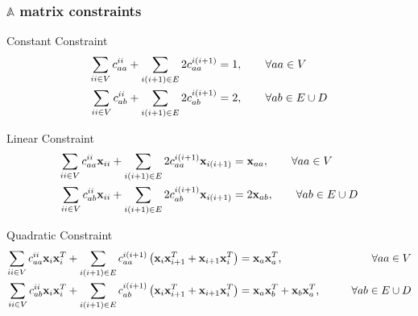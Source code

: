 \documentclass[compress,10pt]{beamer}
\renewcommand{\vec}[1]{\mathbf{#1}}
\begin{document}
\begin{frame}[t]\frametitle{\small $\mathbb{A}$ matrix constraints}
\vspace{-3mm}
\begin{block}{Constant Constraint}{\footnotesize
\begin{equation*}
\begin{aligned}
\sum\displaylimits_{ii \in V} c_{aa}^{ii} + \sum\displaylimits_{i(i+1) \in E} 2 c_{aa}^{i(i+1)} &= 1 , \qquad \forall aa \in V \\
\sum\displaylimits_{ii \in V} c_{ab}^{ii} + \sum\displaylimits_{i(i+1) \in E} 2 c_{ab}^{i(i+1)} &= 2 , \qquad \forall ab \in E \cup D
\end{aligned}
\end{equation*}
}\end{block}
\begin{block}{Linear Constraint}{\footnotesize
\begin{equation*}
\begin{aligned}
\sum\displaylimits_{ii \in V} c_{aa}^{ii} \vec{x}_{ii} + \sum\displaylimits_{i(i+1) \in E} 2 c_{aa}^{i(i+1)} \vec{x}_{i (i+1)} &= \vec{x}_{aa} , \qquad \forall aa \in V \\
\sum\displaylimits_{ii \in V} c_{ab}^{ii} \vec{x}_{ii} + \sum\displaylimits_{i(i+1) \in E} 2 c_{ab}^{i(i+1)} \vec{x}_{i (i+1)} &= 2 \vec{x}_{ab} , \qquad \forall ab \in E \cup D
\end{aligned}
\end{equation*}
}\end{block}
\begin{block}{Quadratic Constraint}{\footnotesize
\begin{equation*}
\begin{aligned}
\sum\displaylimits_{ii \in V} c_{aa}^{ii} \vec{x}_{i} \vec{x}_{i}^T + \sum\displaylimits_{i(i+1) \in E} c_{aa}^{i(i+1)} \left(  \vec{x}_{i} \vec{x}_{i+1}^T + \vec{x}_{i+1} \vec{x}_{i}^T  \right) &= \vec{x}_{a} \vec{x}_{a}^T , \qquad &\forall aa \in V \\
\sum\displaylimits_{ii \in V} c_{ab}^{ii} \vec{x}_{i} \vec{x}_{i}^T + \sum\displaylimits_{i(i+1) \in E} c_{ab}^{i(i+1)} \left(  \vec{x}_{i} \vec{x}_{i+1}^T + \vec{x}_{i+1} \vec{x}_{i}^T  \right) &= \vec{x}_{a} \vec{x}_{b}^T + \vec{x}_{b} \vec{x}_{a}^T, \qquad &\forall ab \in E \cup D
\end{aligned}
\end{equation*}
}\end{block}
\end{frame}
\end{document}

